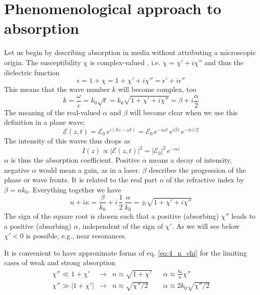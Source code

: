 \section{Phenomenological approach to absorption}

Let us begin by describing absorption in media without attributing a microscopic origin. The susceptibility $\chi$ is complex-valued
, i.e. $\chi = \chi' + i \chi''$ and thus the dielectric function 
\begin{equation}
    \epsilon = 1 + \chi = 1 + \chi' + i \chi'' = \epsilon' + i \epsilon''
\end{equation}
This means that the wave number $k$ will become complex, too
\begin{equation}
    k = \frac{\omega}{c} =  k_0 \sqrt{\epsilon} = k_0 \sqrt{1 + \chi' + i \chi''} = \beta + i \frac{\alpha}{2}
\end{equation}
The meaning of the real-valued $\alpha$ and $\beta$ will become clear when we use this definition in a plane wave:
\begin{equation}
    \mathcal{E}(z,t) =  \mathcal{E}_0 \,  e^{ i (k z - \omega t)} =
     \mathcal{E}_0 \, e^{-i \omega t} \, e^{i \beta z} \, e^{- \alpha z / 2}
\end{equation}
The intensity of this waves thus drops as
\begin{equation}
    I(z) \propto |\mathcal{E}(z,t) |^2 = |\mathcal{E}_0|^2 \, e^{- \alpha z}
\end{equation}
$\alpha$ is thus the absorption coefficient. Positive $\alpha$ means a decay of intensity, negative $\alpha$ would mean a gain, as in a laser. $\beta$ describes the progression of the phase or wave fronts. It is related to the real part $n$ of the refractive index by $\beta = n k_0$. Everything together we have
\begin{equation}
    n + i \kappa = \frac{\beta}{k_0} + i \, \frac{1}{2} \, \frac{\alpha}{k_0} = \pm \sqrt{1 + \chi' + i \chi''}
    \label{eq:4_n_chi}
\end{equation}
The sign of the square root is chosen such that a  positive (absorbing) $\chi''$ leads to a positive (absorbing) $\alpha$, independent of the sign of $\chi'$. As we will see below $\chi' < 0$ is possible, e.g., near resonances.

It is convenient to have approximate forms of eq.  \ref{eq:4_n_chi} for the limiting cases of weak and strong absorption
\begin{align}
    \chi'' \ll 1 + \chi' &  \rightarrow& n \approx \sqrt{1 + \chi'} && \alpha \approx  \frac{k_0}{n} \chi'' \\
    \chi'' \gg |1 + \chi'| & \rightarrow & n \approx \sqrt{\chi'' / 2} && \alpha \approx 2 k_0 \sqrt{ \chi'' / 2}
\end{align}



